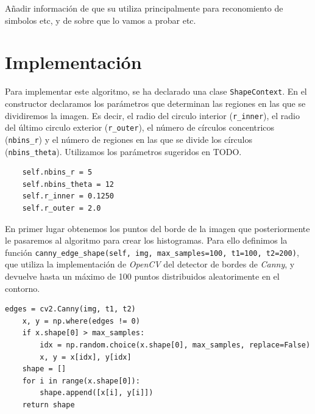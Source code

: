 \documentclass[size=a4, parskip=half, titlepage=false, toc=flat, toc=bib, 12pt]{scrartcl}
\begin{document}
Añadir información de que su utiliza principalmente para reconomiento de simbolos etc, y de sobre que lo vamos a probar etc.

\newpage

\section{Implementación}
Para implementar este algoritmo, se ha declarado una clase \verb|ShapeContext|. En el constructor declaramos los parámetros que determinan las regiones en las que se dividiremos la imagen. Es decir, el radio del circulo interior (\verb|r_inner|), el radio del último circulo exterior (\verb|r_outer|), el número de círculos concentricos (\verb|nbins_r|) y el número de regiones en las que se divide los círculos (\verb|nbins_theta|). Utilizamos los parámetros sugeridos en TODO.

\begin{verbatim}
    self.nbins_r = 5
    self.nbins_theta = 12
    self.r_inner = 0.1250
    self.r_outer = 2.0
\end{verbatim}

En primer lugar obtenemos los puntos del borde de la imagen que posteriormente le pasaremos al algoritmo para crear los histogramas. Para ello definimos la función \texttt{canny\_edge\_shape(self, img, max\_samples=100, t1=100, t2=200)}, que utiliza la implementación de \textit{OpenCV} del detector de bordes de \textit{Canny}, y devuelve hasta un máximo de 100 puntos distribuidos aleatorimente en el contorno.

\begin{verbatim}
edges = cv2.Canny(img, t1, t2)
    x, y = np.where(edges != 0)
    if x.shape[0] > max_samples:
        idx = np.random.choice(x.shape[0], max_samples, replace=False)
        x, y = x[idx], y[idx]
    shape = []
    for i in range(x.shape[0]):
        shape.append([x[i], y[i]])
    return shape
\end{verbatim}
\end{document}
